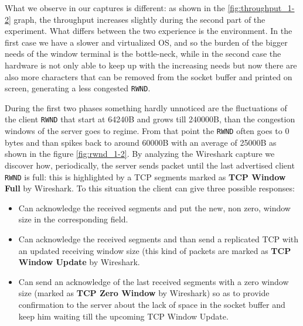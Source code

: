 \documentclass{exam}
\begin{document}
What we observe in our captures is different: as shown in the \ref{fig:throughput_1-2} graph, the throughput increases slightly during the second part of the experiment. What differs between the two experience is the environment. In the first case we have a slower and virtualized OS, and so the burden of the bigger needs of the window terminal is the bottle-neck, while in the second case the hardware is not only able to keep up with the increasing needs but now there are also more characters that can be removed from the socket buffer and printed on screen, generating a less congested \verb|RWND|. 


During the first two phases something hardly unnoticed are the fluctuations of the client \verb|RWND| that start at 64240B and grows till 240000B, than the congestion windows of the server goes to regime. From that point the \verb|RWND| often goes to 0 bytes and than spikes back to around 60000B with an average of 25000B as shown in the figure \ref{fig:rwnd_1-2}. By analyzing the Wireshark capture we discover how, periodically, the server sends packet until the last advertised client \verb|RWND| is full: this is highlighted by a TCP segments marked as \textbf{TCP Window Full} by Wireshark. To this situation the client can give three possible responses:
\begin{itemize}
    \item Can acknowledge the received segments and put the new, non zero, window size in the corresponding field.
    \item Can acknowledge the received segments and than send a replicated TCP with an updated receiving window size (this kind of packets are marked as \textbf{TCP Window Update} by Wireshark.
    \item Can send an acknowledge of the last received segments with a zero window size (marked as \textbf{TCP Zero Window} by Wireshark) so as to provide confirmation to the server about the lack of space in the socket buffer and keep him waiting till the upcoming TCP Window Update.
\end{itemize}
\end{document}
